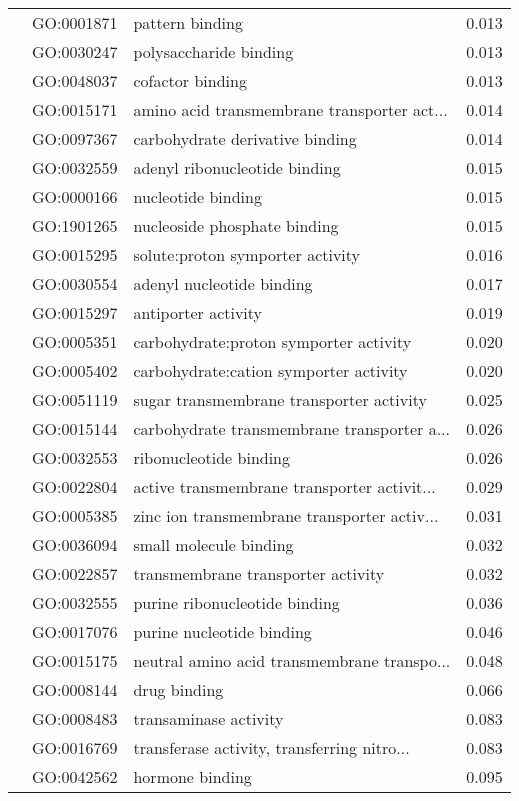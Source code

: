 \begin{longtable}{lllr}
   & GO:0001871 &                              pattern binding &         0.013 \\
   & GO:0030247 &                       polysaccharide binding &         0.013 \\
   & GO:0048037 &                             cofactor binding &         0.013 \\
   & GO:0015171 &  amino acid transmembrane transporter act... &         0.014 \\
   & GO:0097367 &              carbohydrate derivative binding &         0.014 \\
   & GO:0032559 &                adenyl ribonucleotide binding &         0.015 \\
   & GO:0000166 &                           nucleotide binding &         0.015 \\
   & GO:1901265 &                 nucleoside phosphate binding &         0.015 \\
   & GO:0015295 &             solute:proton symporter activity &         0.016 \\
   & GO:0030554 &                    adenyl nucleotide binding &         0.017 \\
   & GO:0015297 &                          antiporter activity &         0.019 \\
   & GO:0005351 &       carbohydrate:proton symporter activity &         0.020 \\
   & GO:0005402 &       carbohydrate:cation symporter activity &         0.020 \\
   & GO:0051119 &     sugar transmembrane transporter activity &         0.025 \\
   & GO:0015144 &  carbohydrate transmembrane transporter a... &         0.026 \\
   & GO:0032553 &                       ribonucleotide binding &         0.026 \\
   & GO:0022804 &  active transmembrane transporter activit... &         0.029 \\
   & GO:0005385 &  zinc ion transmembrane transporter activ... &         0.031 \\
   & GO:0036094 &                       small molecule binding &         0.032 \\
   & GO:0022857 &           transmembrane transporter activity &         0.032 \\
   & GO:0032555 &                purine ribonucleotide binding &         0.036 \\
   & GO:0017076 &                    purine nucleotide binding &         0.046 \\
   & GO:0015175 &  neutral amino acid transmembrane transpo... &         0.048 \\
   & GO:0008144 &                                 drug binding &         0.066 \\
   & GO:0008483 &                        transaminase activity &         0.083 \\
   & GO:0016769 &  transferase activity, transferring nitro... &         0.083 \\
   & GO:0042562 &                              hormone binding &         0.095 \\
\end{longtable}
